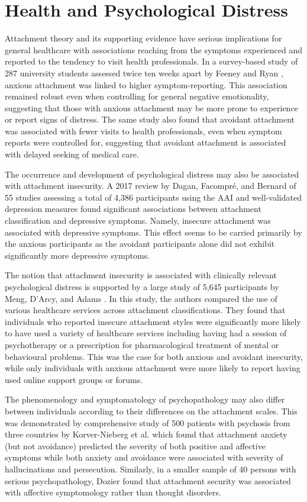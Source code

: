 \documentclass[12pt]{report}
\begin{document}
\section{Health and Psychological Distress}
\label{sec: Health}
Attachment theory and its supporting evidence have serious implications for general healthcare with associations reaching from the symptoms experienced and reported to the tendency to visit health professionals.
In a survey-based study of 287 university students assessed twice ten weeks apart by Feeney and Ryan \citeyear{Feeney1994}, anxious attachment was linked to higher symptom-reporting. This association remained robust even when controlling for general negative emotionality, suggesting that those with anxious attachment may be more prone to experience or report signs of distress.
The same study also found that avoidant attachment was associated with fewer visits to health professionals, even when symptom reports were controlled for, suggesting that avoidant attachment is associated with delayed seeking of medical care.

The occurrence and development of psychological distress may also be associated with attachment insecurity. A 2017 review by Dagan, Facompré, and Bernard \citeyear{Dagan2018} of 55 studies assessing a total of 4,386 participants using the AAI and well-validated depression measures found significant associations between attachment classification and depressive symptoms.
Namely, insecure attachment was associated with depressive symptoms. This effect seems to be carried primarily by the anxious participants as the avoidant participants alone did not exhibit significantly more depressive symptoms.

The notion that attachment insecurity is associated with clinically relevant psychological distress is supported by a large study of 5,645 participants by Meng, D'Arcy, and Adams \citeyear{Meng2015}.
In this study, the authors compared the use of various healthcare services across attachment classifications. They found that individuals who reported insecure attachment styles were significantly more likely to have used a variety of healthcare services including having had a session of psychotherapy or a prescription for pharmacological treatment of mental or behavioural problems. This was the case for both anxious and avoidant insecurity, while only individuals with anxious attachment were more likely to report having used online support groups or forums.

The phenomenology and symptomatology of psychopathology may also differ between individuals according to their differences on the attachment scales.
This was demonstrated by comprehensive study of 500 patients with psychosis from three countries by Korver-Nieberg et al. \citeyear{Korver-Nieberg2015} which found that attachment anxiety (but not avoidance) predicted the severity of both positive and affective symptoms while both anxiety and avoidance were associated with severity of hallucinations and persecution.
Similarly, in a smaller sample of 40 persons with serious psychopathology, Dozier \citeyear{Dozier1990} found that attachment security was associated with affective symptomology rather than thought disorders.
\end{document}
